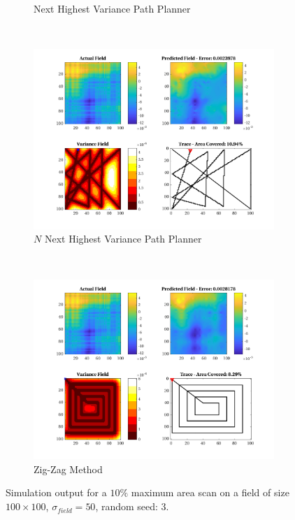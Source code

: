 \begin{figure}[htb!]
\begin{subfigure}[t]{0.5\textwidth}
        \captionsetup{skip=0.10\baselineskip,size=footnotesize}
        \caption{Next Highest Variance Path Planner}
    \end{subfigure}%
    \\
    \begin{subfigure}[t]{0.5\textwidth}
        \centering
        \includegraphics[width=\linewidth]{figures/hbresults/nnhv_10p_100x100_sf_50_seed_3.png}
        \captionsetup{skip=0.10\baselineskip,size=footnotesize}
        \caption{$N$ Next Highest Variance Path Planner}
    \end{subfigure}%
    ~
    \begin{subfigure}[t]{0.5\textwidth}
        \centering
        \includegraphics[width=\linewidth]{figures/hbresults/zz_10p_100x100_sf_50_seed_3.png}
        \captionsetup{skip=0.10\baselineskip,size=footnotesize}
        \caption{Zig-Zag Method}
    \end{subfigure}%
    \captionsetup{skip=0.20\baselineskip}
    \caption{Simulation output for a $10\%$ maximum area scan on a field of size $100 \times 100$, $\sigma_{field} = 50$, random seed: 3.}
    \label{fig:sim_sigma50_p10_s3}
\end{figure}

